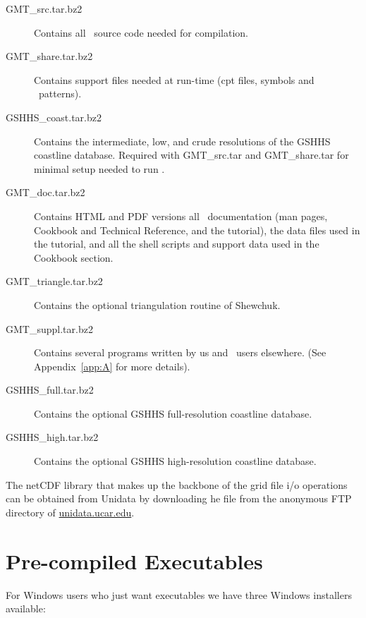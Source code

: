 \begin{description}

\item[GMT\_src.tar.bz2] Contains all \GMT\ source code needed for compilation.

\item[GMT\_share.tar.bz2] Contains support files needed at run-time (cpt files, symbols and \PS\ patterns).

\item[GSHHS\_coast.tar.bz2] Contains the intermediate,
low, and crude resolutions of the GSHHS coastline database.  Required
with GMT\_src.tar and GMT\_share.tar for minimal setup needed to run \GMT.

\item[GMT\_doc.tar.bz2] Contains HTML and PDF versions all \GMT\ documentation
(man pages, Cookbook and Technical Reference, and the tutorial), the data files
used in the tutorial, and all the shell scripts
and support data used in the Cookbook section.

\item[GMT\_triangle.tar.bz2] Contains the optional triangulation routine of Shewchuk.

\item[GMT\_suppl.tar.bz2] Contains several programs
written by us and \GMT\ users elsewhere. (See Appendix~\ref{app:A} for more
details).

\item[GSHHS\_full.tar.bz2] Contains the optional GSHHS
full-resolution coastline database.

\item[GSHHS\_high.tar.bz2] Contains the optional GSHHS
high-resolution coastline database.

\end{description}


The netCDF library that makes up the backbone of the grid file
i/o operations can be obtained from  Unidata by downloading he file
 from the anonymous FTP directory of
\underline{unidata.ucar.edu}.

\section{Pre-compiled Executables}

For Windows users who just want executables we have three Windows installers available:

